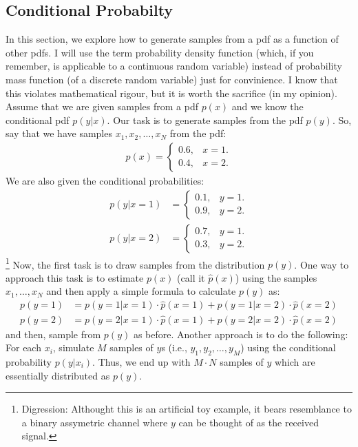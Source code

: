\documentclass[11pt,onecolumn]{article}
\begin{document}
\subsection{Conditional Probabilty}
In this section, we explore how to generate samples from a pdf as a function of other pdfs. I will use the term probability density function (which, if you remember, is applicable to a continuous random variable) instead of probability mass function (of a discrete random variable) just for convinience. I know that this violates mathematical rigour, but it is worth the sacrifice (in my opinion).
Assume that we are given samples from a pdf $p(x)$ and we know the conditional pdf $p(y|x)$. Our task is to generate samples from the pdf $p(y)$. So, say that we have samples $x_1, x_2, \dots, x_N$ from the pdf:
\begin{align}
 p(x) = \begin{cases}
         0.6, & x = 1. \\
         0.4, & x = 2.
        \end{cases}
\end{align}
We are also given the conditional probabilities:
\begin{align}
 p(y|x = 1) &= \begin{cases}
         0.1, & y = 1. \\
         0.9, & y = 2.
        \end{cases} \\
 p(y|x = 2) &= \begin{cases}
         0.7, & y = 1. \\
         0.3, & y = 2.
        \end{cases}
\end{align}
\footnote{Digression: Althought this is an artificial toy example, it bears resemblance to a binary assymetric channel where $y$ can be thought of as the received signal.}
Now, the first task is to draw samples from the distribution $p(y)$. One way to approach this task is to estimate $p(x)$ (call it $\hat p(x)$) using the samples $x_1,\dots,x_N$ and then apply a simple formula to calculate $p(y)$ as:
\begin{align}
 p(y = 1) &= p(y = 1|x = 1) \cdot \hat p(x = 1) + p(y = 1|x = 2)\cdot \hat p(x = 2) \\
 p(y = 2) &= p(y = 2|x = 1) \cdot \hat p(x = 1) + p(y = 2|x = 2)\cdot \hat p(x = 2)
\end{align}
and then, sample from $p(y)$ as before. Another approach is to do the following:
For each $x_i$, simulate $M$ samples of $y$s (i.e., $y_1, y_2, \dots, y_M$) using the conditional probability $p(y|x_i)$. Thus, we end up with $M\cdot N$ samples of $y$ which are essentially distributed as $p(y)$.
\end{document}
